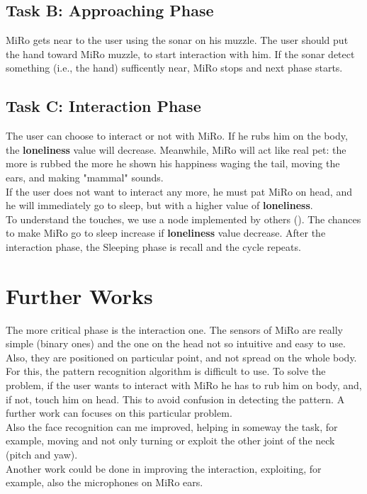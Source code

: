 \documentclass[12pt,peerreviewca, a4paper, onecolumn]{IEEEtran}
\begin{document}
	\subsection{Task B: Approaching Phase}
	MiRo gets near to the user using the sonar on his muzzle. The user should put the hand toward MiRo muzzle, to start interaction with him. If the sonar detect something (i.e., the hand) sufficently near, MiRo stops and next phase starts.
	\subsection{Task C: Interaction Phase}  
	The user can choose to interact or not with MiRo. If he rubs him on the body, the \textbf{loneliness} value will decrease. Meanwhile, MiRo will act like real pet: the more is rubbed the more he shown his happiness waging the tail, moving the ears, and making "mammal" sounds.\\
	If the user does not want to interact any more, he must pat MiRo on head, and he will immediately go to sleep, but with a higher value of \textbf{loneliness}.\\
	To understand the touches, we use a node implemented by others ().
	The chances to make MiRo go to sleep increase if \textbf{loneliness} value decrease. After the interaction phase, the Sleeping phase is recall and the cycle repeats. 
	
	\section{Further Works}
	The more critical phase is the interaction one. The sensors of MiRo are really simple (binary ones) and the one on the head not so intuitive and easy to use. Also, they are positioned on particular point, and not spread on the whole body. For this, the pattern recognition algorithm is difficult to use. To solve the problem, if the user wants to interact with MiRo he has to rub him on body, and, if not, touch him on head. This to avoid confusion in detecting the pattern. A further work can focuses on this particular problem.\\
	Also the face recognition can me improved, helping in someway the task, for example, moving and not only turning or exploit the other joint of the neck (pitch and yaw).\\
	Another work could be done in improving the interaction, exploiting, for example, also the microphones on MiRo ears.
 
	 
		

	
\end{document}
